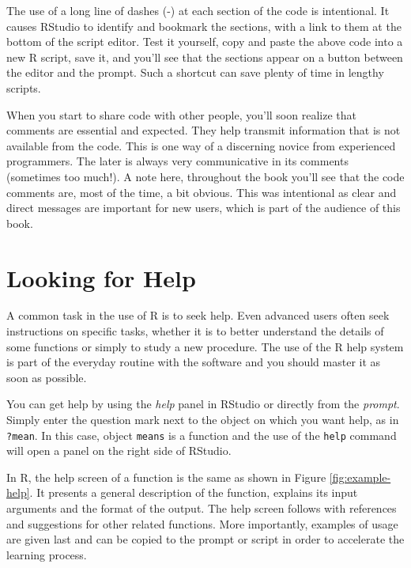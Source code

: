 \documentclass[
  12pt,
]{book}
\newenvironment{rmdcaution}
{\begin{cautionblock}
		
	} {\end{cautionblock}}
\begin{document}
The use of a long line of dashes (-) at each section of the code is intentional. It causes RStudio to identify and bookmark the sections, with a link to them at the bottom of the script editor. Test it yourself, copy and paste the above code into a new R script, save it, and you'll see that the sections appear on a button between the editor and the prompt. Such a shortcut can save plenty of time in lengthy scripts.

\begin{rmdcaution}
When you start to share code with other people, you'll soon realize that
comments are essential and expected. They help transmit information that
is not available from the code. This is one way of a discerning novice
from experienced programmers. The later is always very communicative in
its comments (sometimes too much!). A note here, throughout the book
you'll see that the code comments are, most of the time, a bit obvious.
This was intentional as clear and direct messages are important for new
users, which is part of the audience of this book.
\end{rmdcaution}

\hypertarget{looking-for-help}{%
\section{Looking for Help}\label{looking-for-help}}

A common task in the use of R is to seek help. Even advanced users often seek instructions on specific tasks, whether it is to better understand the details of some functions or simply to study a new procedure. The use of the R help system is part of the everyday routine with the software and you should master it as soon as possible.

You can get help by using the \emph{help} panel in RStudio or directly from the \emph{prompt}. Simply enter the question mark next to the object on which you want help, as in \texttt{?mean}. In this case, object \texttt{means} is a function and the use of the \texttt{help} command will open a panel on the right side of RStudio. 

In R, the help screen of a function is the same as shown in Figure \ref{fig:example-help}. It presents a general description of the function, explains its input arguments and the format of the output. The help screen follows with references and suggestions for other related functions. More importantly, examples of usage are given last and can be copied to the prompt or script in order to accelerate the learning process.
\end{document}
